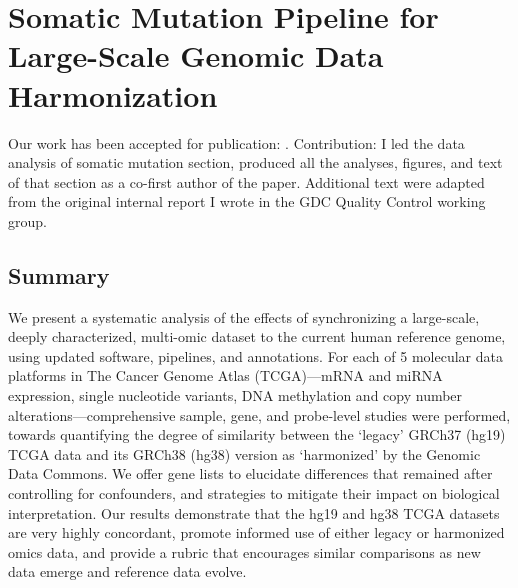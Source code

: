 \chapter{Somatic Mutation Pipeline for Large-Scale Genomic Data Harmonization}
\label{chap:mut-pipeline-qc}


Our work has been accepted for publication: . Contribution: I led the data analysis of somatic mutation section, produced all the analyses, figures, and text of that section as a co-first author of the paper. Additional text were adapted from the original internal report I wrote in the GDC Quality Control working group.


\section{Summary}
We present a systematic analysis of the effects of synchronizing a large-scale, deeply characterized, multi-omic dataset to the current human reference genome, using updated software, pipelines, and annotations.
For each of 5 molecular data platforms in The Cancer Genome Atlas (TCGA)---mRNA and miRNA expression, single nucleotide variants, DNA methylation and copy number alterations---comprehensive sample, gene, and probe-level studies were performed, towards quantifying the degree of similarity between the \enquote*{legacy} GRCh37 (hg19) TCGA data and its GRCh38 (hg38) version as \enquote*{harmonized} by the Genomic Data Commons.
We offer gene lists to elucidate differences that remained after controlling for confounders, and strategies to mitigate their impact on biological interpretation.
Our results demonstrate that the hg19 and hg38 TCGA datasets are very highly concordant, promote informed use of either legacy or harmonized omics data, and provide a rubric that encourages similar comparisons as new data emerge and reference data evolve.


